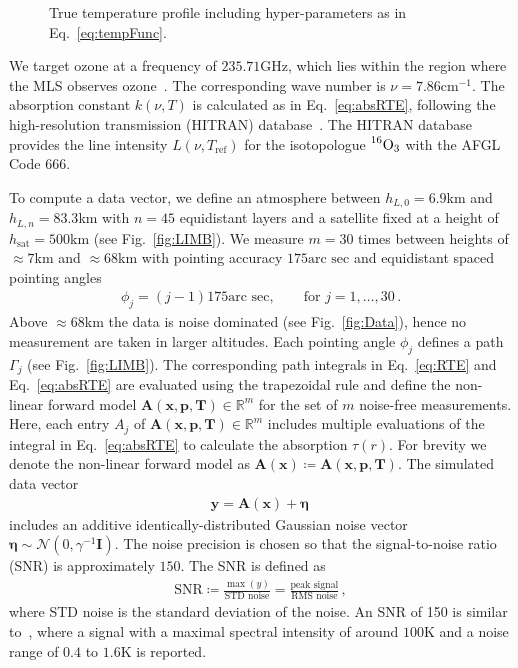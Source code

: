 \documentclass{article}
\begin{document}
\begin{figure}[ht!]
	\centering
	
	\caption[]{True temperature profile including hyper-parameters as in Eq.~\ref{eq:tempFunc}.}
	\label{fig:TrueTemp}
\end{figure}

We target ozone at a frequency of $235.71$GHz, which lies within the region where the MLS observes ozone~\cite{livesey2008ozonecarbonmono, waters2006earth}.
The corresponding wave number is $\nu = 7.86\text{cm}^{-1}$.
The absorption constant $k(\nu,T)$ is calculated as in Eq.~\ref{eq:absRTE}, following the high-resolution transmission (HITRAN) database~\cite{gordon2022hitran2020}.
The HITRAN database provides the line intensity $L(\nu,T_{\text{ref}})$ for the isotopologue $\prescript{16}{}{\text{O}}_3$ with the AFGL Code 666.

To compute a data vector, we define an atmosphere between $h_{L,0} = 6.9$km and $h_{L,n} = 83.3$km with $n = 45$ equidistant layers and a satellite fixed at a height of $h_{\text{sat}} = 500$km (see Fig.~\ref{fig:LIMB}).
We measure $m=30$ times between heights of $\approx 7$km and $\approx 68$km with pointing accuracy $175  \text{arc sec}$ and equidistant spaced pointing angles
\begin{align*} 
		\phi_j  =  (j-1) 175 \text{arc sec} ,  \qquad  \text{for } j = 1, \dots, 30\, .
\end{align*}
Above $\approx 68$km the data is noise dominated (see Fig.~\ref{fig:Data}), hence no measurement are taken in larger altitudes.
Each pointing angle $\phi_j$ defines a path $\Gamma_j$ (see Fig.~\ref{fig:LIMB}).
The corresponding path integrals in Eq.~\ref{eq:RTE} and Eq.~\ref{eq:absRTE} are evaluated using the trapezoidal rule and define the non-linear forward model $\bm{A}(\bm{x},  \bm{p},\bm{T})   \in \mathbb{R}^{m}$ for the set of $m$ noise-free measurements.
Here, each entry $A_{j}$ of $\bm{A}(\bm{x},\bm{p},\bm{T})\in \mathbb{R}^{m}$ includes multiple evaluations of the integral in Eq.~\ref{eq:absRTE} to calculate the absorption $\tau(r)$.
For brevity we denote the non-linear forward model as $\bm{A}(\bm{x}) \coloneqq \bm{A}(\bm{x},  \bm{p},\bm{T})$.
The simulated data vector
\begin{align}
	\bm{y} = \bm{A}(\bm{x}) + \bm{\eta}\, 
\end{align}
includes an additive identically-distributed Gaussian noise vector $\bm{\eta} \sim \mathcal{N}(0,\gamma^{-1} \bm{I})$.
The noise precision is chosen so that the signal-to-noise ratio (SNR) is approximately $150$.
The SNR is defined as
\begin{align}
	\text{SNR} \coloneqq \frac{\max(y)}{\text{STD noise}} = \frac{\text{peak signal}}{\text{RMS noise}} \label{eq:SNR} \, ,
\end{align}
where STD noise is the standard deviation of the noise.
An SNR of 150 is similar to~\cite{Froidevaux2008snrozone}, where a signal with a maximal spectral intensity of around $100\text{K}$ and a noise range of $0.4$ to $1.6\text{K}$ is reported.
\end{document}
